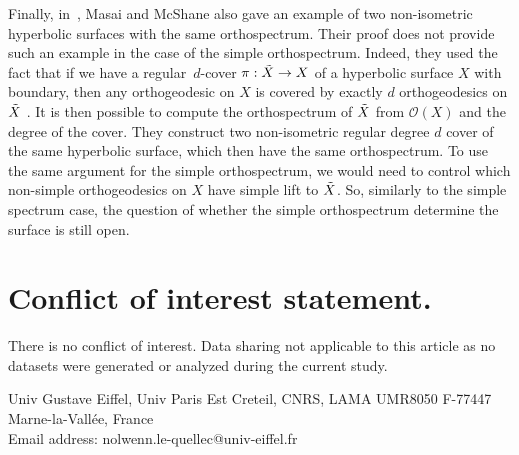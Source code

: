 \documentclass[a4paper,12pt]{article}
\makeatletter
\newcommand{\address}{Univ Gustave Eiffel, Univ Paris Est Creteil, CNRS, LAMA UMR8050 F-77447 Marne-la-Vallée, France}
\newcommand{\email}{nolwenn.le-quellec@univ-eiffel.fr}
\theoremstyle{definition}
\theoremstyle{remark}
\makeatother
\begin{document}
Finally, in~\cite{orthoSys}, Masai and McShane also gave an example of two non-isometric hyperbolic surfaces with the same orthospectrum. Their proof does not provide such an example in the case of the simple orthospectrum. Indeed, they used the fact that if we have a regular~$d$-cover $\pi : \Tilde{X} \to X$ of a hyperbolic surface $X$ with boundary, then any orthogeodesic on $X$ is covered by exactly $d$ orthogeodesics on $\Tilde{X}$ \cite[Lemma~6.1]{orthoSys}. It is then possible to compute the orthospectrum of $\Tilde{X}$ from $\mathcal{O}(X)$ and the degree of the cover. They construct two non-isometric regular degree $d$ cover of the same hyperbolic surface, which then have the same orthospectrum. To use the same argument for the simple orthospectrum, we would need to control which non-simple orthogeodesics on $X$ have simple lift to $\Tilde{X}$. So, similarly to the simple spectrum case, the question of whether the simple orthospectrum determine the surface is still open.

\section{Conflict of interest statement.}
There is no conflict of interest. Data sharing not applicable to this
article as no datasets were generated or analyzed during the current study.





\begin{flushright}
    \address \\
    Email address: \email
\end{flushright}
    
\end{document}
